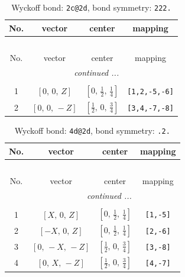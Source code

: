 \documentclass[fleqn,8pt]{jsarticle}
\begin{document}
\begin{longtable}{cccc}
\caption{Wyckoff bond: {\tt 2c@2d}, bond symmetry: {\tt 222.}}
 \\
 \hline \hline
No. & vector & center & mapping \\ \hline \endfirsthead

\multicolumn{3}{l}{\tablename\ \thetable{}} \\
 \hline \hline
No. & vector & center & mapping \\ \hline \endhead

 \hline \hline
\multicolumn{3}{r}{\footnotesize\it continued ...} \\ \endfoot

 \hline \hline
\multicolumn{3}{r}{} \\ \endlastfoot

1 & $\left[ 0,\, 0,\, Z \right]$ & $\left[ 0,\, \frac{1}{2},\, \frac{1}{4} \right]$ & {\tt [1,2,-5,-6]} \\ \hline
2 & $\left[ 0,\, 0,\, - Z \right]$ & $\left[ \frac{1}{2},\, 0,\, \frac{3}{4} \right]$ & {\tt [3,4,-7,-8]} \\
\end{longtable}
\renewcommand{\arraystretch}{1.2}
\begin{longtable}{cccc}
\caption{Wyckoff bond: {\tt 4d@2d}, bond symmetry: {\tt .2.}}
 \\
 \hline \hline
No. & vector & center & mapping \\ \hline \endfirsthead

\multicolumn{3}{l}{\tablename\ \thetable{}} \\
 \hline \hline
No. & vector & center & mapping \\ \hline \endhead

 \hline \hline
\multicolumn{3}{r}{\footnotesize\it continued ...} \\ \endfoot

 \hline \hline
\multicolumn{3}{r}{} \\ \endlastfoot

1 & $\left[ X,\, 0,\, Z \right]$ & $\left[ 0,\, \frac{1}{2},\, \frac{1}{4} \right]$ & {\tt [1,-5]} \\ \hline
2 & $\left[ - X,\, 0,\, Z \right]$ & $\left[ 0,\, \frac{1}{2},\, \frac{1}{4} \right]$ & {\tt [2,-6]} \\ \hline
3 & $\left[ 0,\, - X,\, - Z \right]$ & $\left[ \frac{1}{2},\, 0,\, \frac{3}{4} \right]$ & {\tt [3,-8]} \\ \hline
4 & $\left[ 0,\, X,\, - Z \right]$ & $\left[ \frac{1}{2},\, 0,\, \frac{3}{4} \right]$ & {\tt [4,-7]} \\
\end{longtable}
\end{document}
